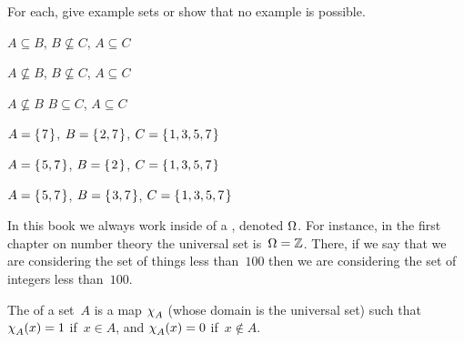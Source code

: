 \documentclass{ibl}  %
\begin{document}
\begin{problem}[\maxlength] 
For each, give example sets or show that no example is possible.
\begin{items}
\item $A\subseteq B$, $B\not\subseteq C$, $A\subseteq C$
\item $A\not\subseteq B$, $B\not\subseteq C$, $A\subseteq C$
\item $A\not\subseteq B$ $B\subseteq C$, $A\subseteq C$    
\end{items}
\begin{ans}
\begin{items}
\item $A=\mbox{$\{\hspace{0.1em}7\hspace{0.1em}\}$}$, $B=\mbox{$\{\hspace{0.1em}2,7\hspace{0.1em}\}$}$, $C=\mbox{$\{\hspace{0.1em}1,3,5,7\hspace{0.1em}\}$}$
\item $A=\mbox{$\{\hspace{0.1em}5,7\hspace{0.1em}\}$}$, $B=\mbox{$\{\hspace{0.1em}2\hspace{0.1em}\}$}$, $C=\mbox{$\{\hspace{0.1em}1,3,5,7\hspace{0.1em}\}$}$
\item $A=\mbox{$\{\hspace{0.1em}5,7\hspace{0.1em}\}$}$, $B=\mbox{$\{\hspace{0.1em}3,7\hspace{0.1em}\}$}$, $C=\mbox{$\{\hspace{0.1em}1,3,5,7\hspace{0.1em}\}$}$
\end{items}
\end{ans}
\end{problem}

In this book we always work inside of a , 
denoted $\Omega$.
For instance, in the first chapter on number theory  
the universal set is~$\Omega=\mathbb{Z}$.
There, if we say that we are considering 
the set of things less than~$100$ then 
we are considering the set of integers less than~$100$.

\begin{df}
The  of a set~$A$ is a map
$\charfcn{A}$ (whose domain is the universal set) such that
$\charfcn{A}(x)=1$ if~$x\in A$, and $\charfcn{A}(x)=0$ if~$x\notin A$.  
\end{df}
\end{document}

